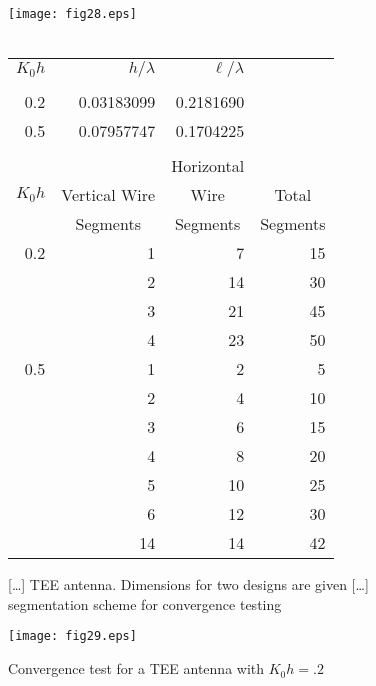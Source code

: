\documentclass[12pt]{article}
\begin{document}
\begin{figure}[htb]
\begin{center}
\vspace*{-5mm}
\texttt{[image: fig28.eps]}\\
\ \\
\begin{tabular}{r|r|r|r}
$K_0h$ & $h/\lambda$ & $\ell/\lambda$ \\[3pt]
\cline{1-3}
       &             &                    \\[-8pt]
0.2    & 0.03183099  & 0.2181690          \\
0.5    & 0.07957747  & 0.1704225          \\
\multicolumn{4}{c}{}               \\
                                   &
                                   &
\multicolumn{1}{c|}{Horizontal}    &
                                   \\
\multicolumn{1}{c|}{$K_0h$}        &
\multicolumn{1}{c|}{Vertical Wire} &
\multicolumn{1}{c|}{Wire}          &
\multicolumn{1}{c}{Total}          \\
                                   &
\multicolumn{1}{c|}{Segments}      &
\multicolumn{1}{c|}{Segments}      &
\multicolumn{1}{c}{Segments}       \\
\hline
0.2 &  1  &  7 & 15 \\
    &  2  & 14 & 30 \\
    &  3  & 21 & 45 \\
    &  4  & 23 & 50 \\
\hline
0.5 &  1  &  2 &  5 \\
    &  2  &  4 & 10 \\
    &  3  &  6 & 15 \\
    &  4  &  8 & 20 \\
    &  5  & 10 & 25 \\
    &  6  & 12 & 30 \\
    & 14  & 14 & 42 \\
\end{tabular}
\end{center}
\caption{[\ldots] TEE antenna. Dimensions for two designs are given [\ldots]
segmentation scheme for convergence testing}
\label{fig28}
\end{figure}

\begin{sidewaysfigure}[htb]
\centerline{\texttt{[image: fig29.eps]}}
\caption{Convergence test for a TEE antenna with $K_0 h = .2$}
\label{fig29}
\end{sidewaysfigure}
\end{document}
